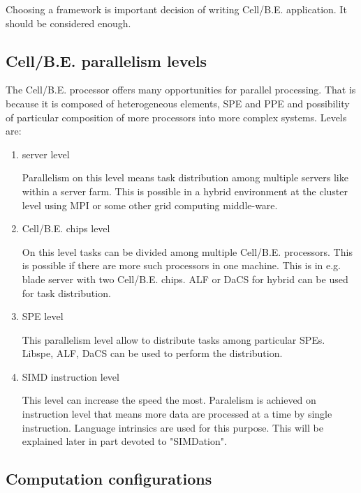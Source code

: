 Choosing a framework is important decision of writing Cell/B.E. application.
It should be considered enough.

\subsection {Cell/B.E. parallelism levels}

The Cell/B.E. processor offers many opportunities for parallel processing.
That is because it is composed of heterogeneous elements, SPE and PPE and possibility of particular composition of more processors into more complex systems.
 Levels are:
\begin{enumerate}
\item server level
\par
Parallelism on this level means task distribution among multiple servers like within a server farm.
This is possible in a hybrid environment at the cluster level using MPI or some other grid computing middle-ware.

\item Cell/B.E. chips level
\par
On this level tasks can be divided among multiple Cell/B.E. processors.
This is possible if there are more such processors in one machine.
This is in e.g. blade server with two Cell/B.E. chips.
ALF or DaCS for hybrid can be used for task distribution.

\item SPE level
\par
This parallelism level allow to distribute tasks among particular SPEs.
Libspe, ALF, DaCS can be used to perform the distribution.

\item SIMD instruction level
\par
This level can increase the speed the most.
Paralelism is achieved on instruction level that means more data are processed at a time by single instruction.
Language intrinsics are used for this purpose.
This will be explained later in part devoted to "SIMDation".
\end{enumerate}

\subsection{Computation configurations}

